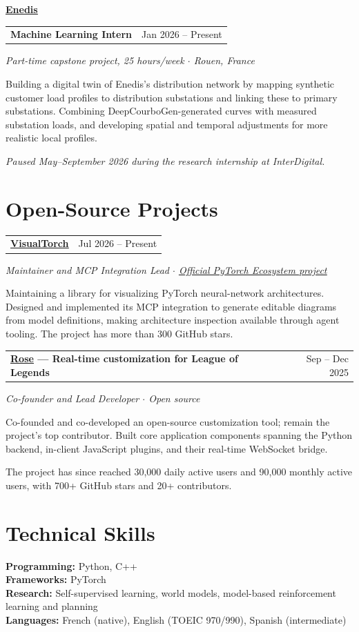 \documentclass[11pt,a4paper]{article}
\makeatletter
\let\plainhref\href
\renewcommand{\href}[2]{%
  \plainhref{#1}{\uline{#2}}%
}
\newcommand{\entry}[3]{%
  \Needspace{5\baselineskip}%
  \vspace{3pt}%
  {\setlength{\parskip}{0pt}%
    \begin{tabularx}{\linewidth}{@{}>{\raggedright\arraybackslash}Xr@{}}%
      \textbf{#1} & {\small\color{muted} #2}\\%
    \end{tabularx}\par\nobreak
    {\small\color{muted}\textit{#3}}\par\nobreak
  }\vspace{2pt}\nobreak
}
\newenvironment{employment}[2]{%
  \Needspace{8\baselineskip}%
  \vspace{3pt}%
  {\setlength{\parskip}{0pt}%
    \textbf{\color{accent}\href{#2}{#1}}\par\nobreak
  }%
  \begin{list}{}{%
    \setlength{\leftmargin}{12pt}%
    \setlength{\rightmargin}{0pt}%
    \setlength{\topsep}{0pt}%
    \setlength{\partopsep}{0pt}%
    \setlength{\parsep}{4pt}%
    \setlength{\itemsep}{0pt}%
  }%
  \item\relax
}{%
  \end{list}%
}
\newcommand{\entrygap}{\par\addvspace{6pt}}
\makeatother
\begin{document}
\entrygap
\begin{employment}{Enedis}{https://www.enedis.fr/}
\entry{Machine Learning Intern}{Jan 2026 -- Present}{Part-time capstone project, 25 hours/week $\cdot$ Rouen, France}
Building a digital twin of Enedis's distribution network by mapping synthetic
customer load profiles to distribution substations and linking these to primary
substations. Combining DeepCourboGen-generated curves with measured substation
loads, and developing spatial and temporal adjustments for more realistic local
profiles.

{\small\color{muted}\textit{Paused May--September 2026 during the research internship at InterDigital.}}
\end{employment}

\section*{Open-Source Projects}
\entry{\href{https://github.com/willyfh/visualtorch}{VisualTorch}}{Jul 2026 -- Present}{Maintainer and MCP Integration Lead $\cdot$ \href{https://pytorch.org/blog/pytorch-ecosystem-landscape-q3-update/}{Official PyTorch Ecosystem project}}
Maintaining a library for visualizing PyTorch neural-network architectures.
Designed and implemented its MCP integration to generate editable diagrams from
model definitions, making architecture inspection available through agent tooling.
The project has more than 300 GitHub stars.

\entrygap
\entry{\href{https://github.com/Alban1911/Rose}{Rose} --- Real-time customization for League of Legends}{Sep -- Dec 2025}{Co-founder and Lead Developer $\cdot$ Open source}
Co-founded and co-developed an open-source customization tool; remain the project's
top contributor. Built core application components spanning the Python backend,
in-client JavaScript plugins, and their real-time WebSocket bridge.

The project has since reached 30,000 daily active users and 90,000 monthly active
users, with 700+ GitHub stars and 20+ contributors.

\section*{Technical Skills}
\textbf{Programming:} Python, C++\\
\textbf{Frameworks:} PyTorch\\
\textbf{Research:} Self-supervised learning, world models, model-based reinforcement learning and planning\\
\textbf{Languages:} French (native), English (TOEIC 970/990), Spanish (intermediate)
\end{document}
